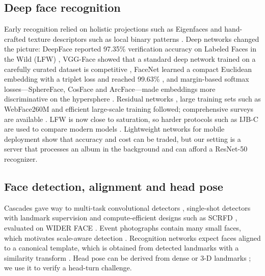 \documentclass[conference]{IEEEtran}
\begin{document}
\subsection{Deep face recognition}
Early recognition relied on holistic projections such as Eigenfaces \cite{turk1991} and hand-crafted texture descriptors such as local binary patterns \cite{ahonen2006}. Deep networks changed the picture: DeepFace reported 97.35\% verification accuracy on Labeled Faces in the Wild (LFW) \cite{taigman2014,huang2007lfw}, VGG-Face showed that a standard deep network trained on a carefully curated dataset is competitive \cite{parkhi2015}, FaceNet learned a compact Euclidean embedding with a triplet loss and reached 99.63\% \cite{schroff2015}, and margin-based softmax losses---SphereFace, CosFace and ArcFace---made embeddings more discriminative on the hypersphere \cite{liu2017sphereface,wang2018cosface,deng2019arcface,deng2022arcface}. Residual networks \cite{he2016resnet}, large training sets such as WebFace260M \cite{zhu2021webface260m} and efficient large-scale training \cite{an2022partialfc} followed; comprehensive surveys are available \cite{wang2021survey}. LFW is now close to saturation, so harder protocols such as IJB-C are used to compare modern models \cite{maze2018ijbc,huang2014lfw}. Lightweight networks for mobile deployment \cite{chen2018mobilefacenets} show that accuracy and cost can be traded, but our setting is a server that processes an album in the background and can afford a ResNet-50 recognizer.

\subsection{Face detection, alignment and head pose}
Cascades \cite{viola2001} gave way to multi-task convolutional detectors \cite{zhang2016mtcnn}, single-shot detectors with landmark supervision \cite{deng2020retinaface} and compute-efficient designs such as SCRFD \cite{guo2022scrfd}, evaluated on WIDER FACE \cite{yang2016widerface}. Event photographs contain many small faces, which motivates scale-aware detection \cite{hu2017tinyfaces}. Recognition networks expect faces aligned to a canonical template, which is obtained from detected landmarks with a similarity transform \cite{umeyama1991}. Head pose can be derived from dense or 3-D landmarks \cite{bulat2017,murphy2009}; we use it to verify a head-turn challenge.
\end{document}
